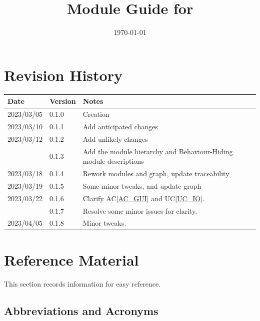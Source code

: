 \documentclass[12pt, titlepage]{article}
\newcommand{\acref}[1]{AC\ref{#1}}
\newcommand{\uref}[1]{UC\ref{#1}}
\begin{document}
\title{Module Guide for \progname{}} 
\author{\authname}
\date{\today}

\maketitle


\section{Revision History}

\begin{tabularx}{\textwidth}{p{3cm}p{2cm}X}
\toprule {\bf Date} & {\bf Version} & {\bf Notes}\\
\midrule
2023/03/05 & 0.1.0 & Creation\\
2023/03/10 & 0.1.1 & Add anticipated changes\\
2023/03/12 & 0.1.2 & Add unlikely changes\\
           & 0.1.3 & Add the module hierarchy and Behaviour-Hiding module descriptions\\
2023/03/18 & 0.1.4 & Rework modules and graph, update traceability\\
2023/03/19 & 0.1.5 & Some minor tweaks, and update graph\\
2023/03/22 & 0.1.6 & Clarify \acref{AC_GUI} and \uref{UC_IO}.\\
           & 0.1.7 & Resolve some minor issues for clarity.\\
2023/04/05 & 0.1.8 & Minor tweaks.\\
\bottomrule
\end{tabularx}

\newpage

\section{Reference Material}

This section records information for easy reference.

\subsection{Abbreviations and Acronyms}
\end{document}
